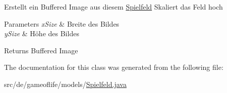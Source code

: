 Erstellt ein Buffered Image aus diesem \hyperlink{classde_1_1gameoflife_1_1models_1_1Spielfeld}{Spielfeld} Skaliert das Feld hoch 
\begin{DoxyParams}{Parameters}
{\em x\-Size} & Breite des Bildes \\
\hline
{\em y\-Size} & Höhe des Bildes \\
\hline
\end{DoxyParams}
\begin{DoxyReturn}{Returns}
Buffered Image 
\end{DoxyReturn}


The documentation for this class was generated from the following file\-:\begin{DoxyCompactItemize}
\item 
src/de/gameoflife/models/\hyperlink{Spielfeld_8java}{Spielfeld.\-java}\end{DoxyCompactItemize}
